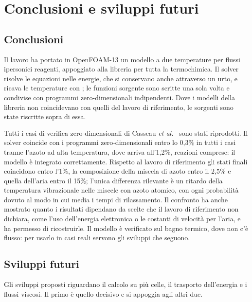 \section{Conclusioni e sviluppi futuri}
\label{sec:conclusioni}

\subsection{Conclusioni}
\label{sec:conclusioni-sintesi}

Il lavoro ha portato in OpenFOAM-13 un modello a due temperature per flussi
ipersonici reagenti, appoggiato alla libreria \mpp{} per tutta la
termochimica. Il solver risolve le equazioni nelle energie, che si conservano
anche attraverso un urto, e ricava le temperature con \mpp; le funzioni
sorgente sono scritte una sola volta e condivise con programmi
zero-dimensionali indipendenti. Dove i modelli della libreria non coincidevano
con quelli del lavoro di riferimento, le sorgenti sono state riscritte sopra di
essa.

Tutti i casi di verifica zero-dimensionali di Casseau
\textit{et al.}~\cite{casseau2016} sono stati riprodotti. Il solver coincide
con i programmi zero-dimensionali entro lo 0{,}3\% in tutti i casi tranne
l'azoto ad alta temperatura, dove arriva all'1{,}2\%, reazioni comprese: il modello è integrato correttamente.
Rispetto al lavoro di riferimento gli stati finali coincidono entro l'1\%, la
composizione della miscela di azoto entro il 2{,}5\% e quella dell'aria entro
il 15\%; l'unica differenza rilevante è un ritardo della temperatura
vibrazionale nelle miscele con azoto atomico, con ogni probabilità dovuto al
modo in cui \mpp{} media i tempi di rilassamento. Il confronto ha anche
mostrato quanto i risultati dipendano da scelte che il lavoro di riferimento non dichiara,
come l'uso dell'energia elettronica o le costanti di velocità per l'aria, e ha
permesso di ricostruirle. Il modello è verificato sul bagno termico, dove non
c'è flusso: per usarlo in casi reali servono gli sviluppi che seguono.

\subsection{Sviluppi futuri}
\label{sec:sviluppi}

Gli sviluppi proposti riguardano il calcolo su più celle, il trasporto
dell'energia e i flussi viscosi. Il primo è quello decisivo e si appoggia agli
altri due.

